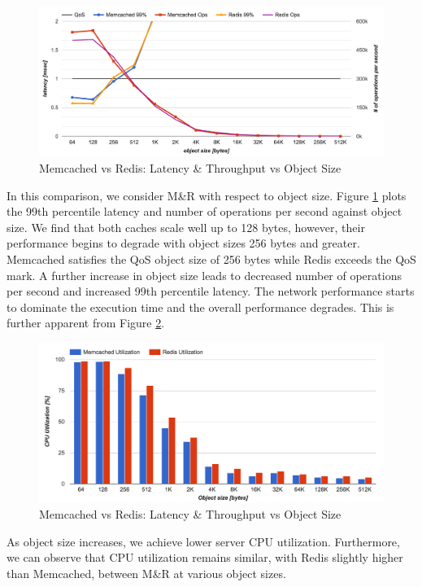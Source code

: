 \begin{figure}[h]
    \includegraphics[width=\textwidth]{./res2/mr_object_size.png}
    \caption{Memcached vs Redis: Latency \& Throughput vs Object Size}
    \label{fig:mr_object_size}
\end{figure}

In this comparison, we consider M\&R with respect to object size. Figure \ref{fig:mr_object_size} plots the 99th percentile latency and number of operations per second against object size. We find that both caches scale well up to 128 bytes, however, their performance begins to degrade with object sizes 256 bytes and greater. Memcached satisfies the QoS object size of 256 bytes while Redis exceeds the QoS mark. A further increase in object size leads to decreased number of operations per second and increased 99th percentile latency. The network performance starts to dominate the execution time and the overall performance degrades. This is further apparent from Figure \ref{fig:mr_object_size_cpu}.

\begin{figure}[h]
    \includegraphics[width=\textwidth]{./res2/mr_object_size_cpu.png}
    \caption{Memcached vs Redis: Latency \& Throughput vs Object Size}
    \label{fig:mr_object_size_cpu}
\end{figure}

As object size increases, we achieve lower server CPU utilization. Furthermore, we can observe that CPU utilization remains similar, with Redis slightly higher than Memcached, between M\&R at various object sizes.

